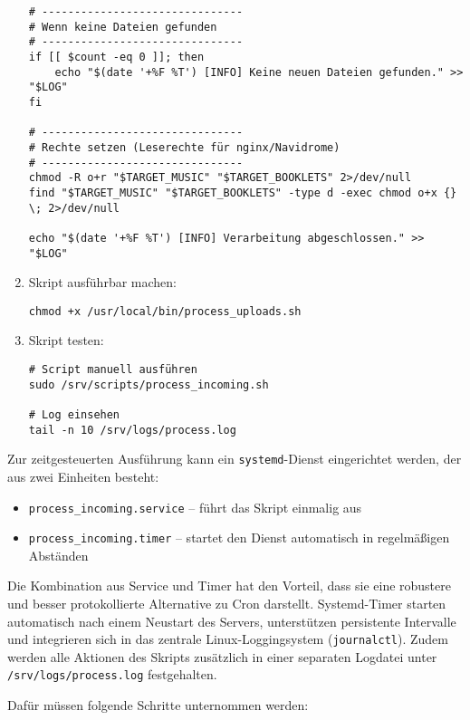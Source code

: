 \documentclass[12pt,a4paper]{report}
\begin{document}
\begin{enumerate}
\begin{verbatim}
# -------------------------------
# Wenn keine Dateien gefunden
# -------------------------------
if [[ $count -eq 0 ]]; then
    echo "$(date '+%F %T') [INFO] Keine neuen Dateien gefunden." >> "$LOG"
fi

# -------------------------------
# Rechte setzen (Leserechte für nginx/Navidrome)
# -------------------------------
chmod -R o+r "$TARGET_MUSIC" "$TARGET_BOOKLETS" 2>/dev/null
find "$TARGET_MUSIC" "$TARGET_BOOKLETS" -type d -exec chmod o+x {} \; 2>/dev/null

echo "$(date '+%F %T') [INFO] Verarbeitung abgeschlossen." >> "$LOG"
    \end{verbatim}

    \item Skript ausführbar machen:
    \begin{verbatim}
chmod +x /usr/local/bin/process_uploads.sh
    \end{verbatim}

    \item Skript testen:
    \begin{verbatim}
# Script manuell ausführen
sudo /srv/scripts/process_incoming.sh

# Log einsehen
tail -n 10 /srv/logs/process.log
    \end{verbatim}
  \end{enumerate}

  Zur zeitgesteuerten Ausführung kann ein \texttt{systemd}-Dienst eingerichtet werden, 
  der aus zwei Einheiten besteht:
  \begin{itemize}
    \item \texttt{process\_incoming.service} – führt das Skript einmalig aus
    \item \texttt{process\_incoming.timer} – startet den Dienst automatisch in regelmäßigen Abständen
  \end{itemize}

  Die Kombination aus Service und Timer hat den Vorteil, dass sie eine robustere und besser protokollierte Alternative zu Cron darstellt. 
  Systemd-Timer starten automatisch nach einem Neustart des Servers, unterstützen persistente Intervalle und integrieren sich in das zentrale Linux-Loggingsystem (\texttt{journalctl}). 
  Zudem werden alle Aktionen des Skripts zusätzlich in einer separaten Logdatei unter \texttt{/srv/logs/process.log} festgehalten.

  Dafür müssen folgende Schritte unternommen werden:
\end{document}
